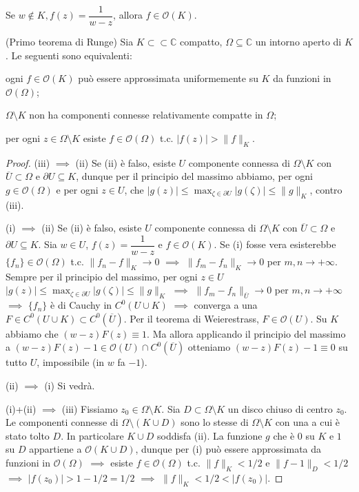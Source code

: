 \begin{ex}
  Se $w \not\in K, f(z)=\dfrac{1}{w-z}$, allora $f \in \mathcal{O}(K)$.
\end{ex}

\begin{thm}
  (Primo teorema di Runge) Sia $K \subset\subset \mathbb{C}$ compatto, $\Omega \subseteq \mathbb{C}$ un intorno aperto di $K$. Le seguenti sono equivalenti:
  \begin{nlist}
    \item ogni $f \in \mathcal{O}(K)$ può essere approssimata uniformemente su $K$ da funzioni in $\mathcal{O}(\Omega)$;
    \item $\Omega \setminus K$ non ha componenti connesse relativamente compatte in $\Omega$;
    \item per ogni $z \in \Omega \setminus K$ esiste $f \in \mathcal{O}(\Omega)$ t.c. $|f(z)|>\|f\|_K$.
  \end{nlist}
\end{thm}

\begin{proof}
  (iii) $\implies$ (ii) Se (ii) è falso, esiste $U$ componente connessa di $\Omega \setminus K$ con $\overline{U} \subset \Omega$ e $\partial U \subseteq K$, dunque per il principio del massimo abbiamo, per ogni $g \in \mathcal{O}(\Omega)$ e per ogni $z \in U$, che $|g(z)|\le \max_{\zeta \in \partial U} |g(\zeta)| \le \|g\|_K$, contro (iii).

  (i) $\implies$ (ii) Se (ii) è falso, esiste $U$ componente connessa di $\Omega \setminus K$ con $\overline{U} \subset \Omega$ e $\partial U \subseteq K$. Sia $w \in U$, $f(z)=\dfrac{1}{w-z}$ e $f \in \mathcal{O}(K)$.
  Se (i) fosse vera esisterebbe $\{f_n\} \in \mathcal{O}(\Omega)$ t.c. $\|f_n-f\|_K \longrightarrow 0$ $\implies$ $\|f_m-f_n\|_K \longrightarrow 0$ per $m, n \longrightarrow +\infty$.
  Sempre per il principio del massimo, per ogni $z \in U$ $|g(z)|\le \max_{\zeta \in \partial U} |g(\zeta)| \le \|g\|_K$ $\implies$ $\|f_m-f_n\|_{\overline{U}} \longrightarrow 0$ per $m,n \longrightarrow +\infty$ $\implies$ $\{f_n\}$ è di Cauchy in $C^0(U \cup K)$ $\implies$ converga a una $F \in C^0(U \cup K) \subset C^0(\overline{U})$.
  Per il teorema di Weierestrass, $F \in \mathcal{O}(U)$. Su $K$ abbiamo che $(w-z)F(z)\equiv 1$. Ma allora applicando il principio del massimo a $(w-z)F(z)-1 \in \mathcal{O}(U) \cap C^0(\overline{U})$ otteniamo $(w-z)F(z)-1 \equiv 0$ su tutto $U$, impossibile (in $w$ fa $-1$).

  (ii) $\implies$ (i) Si vedrà.

  (i)+(ii) $\implies$ (iii) Fissiamo $z_0 \in \Omega \setminus K$. Sia $D \subset \Omega \setminus K$ un disco chiuso di centro $z_0$. Le componenti connesse di $\Omega \setminus (K \cup D)$ sono lo stesse di $\Omega \setminus K$ con una a cui è stato tolto $D$. In particolare $K \cup D$ soddisfa (ii).
  La funzione $g$ che è $0$ su $K$ e $1$ su $D$ appartiene a $\mathcal{O}(K \cup D)$, dunque per (i) può essere approssimata da funzioni in $\mathcal{O}(\Omega)$ $\implies$ esiste $f \in \mathcal{O}(\Omega)$ t.c. $\|f\|_K<1/2$ e $\|f-1\|_D<1/2$ $\implies$ $|f(z_0)|>1-1/2=1/2$ $\implies$ $\|f\|_K<1/2<|f(z_0)|$.
\end{proof}
